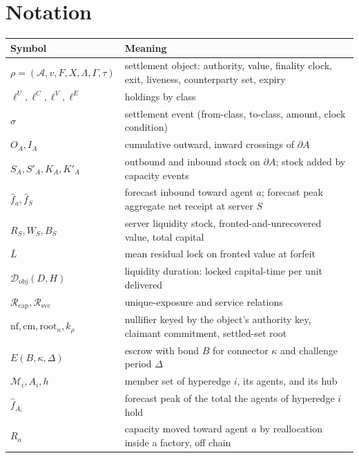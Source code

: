\documentclass[11pt]{article}
\theoremstyle{plain}
\theoremstyle{definition}
\theoremstyle{remark}
\newcommand{\Dur}{\mathcal{D}}
\newcommand{\Rcap}{\mathcal{R}_{\mathrm{cap}}}
\newcommand{\Rsvc}{\mathcal{R}_{\mathrm{svc}}}
\newcommand{\auth}{\mathcal{A}}
\begin{document}



\appendix

\section{Notation}
\label{app:notation}

\begin{center}
\small
\begin{tabular}{@{}>{\raggedright\arraybackslash}p{4.6cm}>{\raggedright\arraybackslash}p{9.6cm}@{}}
\toprule
Symbol & Meaning \\
\midrule
$\rho=(\auth,v,F,X,\Lambda,\Gamma,\tau)$ & settlement object: authority, value, finality clock, exit, liveness, counterparty set, expiry \\
$\ell^U,\ell^C,\ell^V,\ell^E$ & holdings by class \\
$\sigma$ & settlement event (from-class, to-class, amount, clock condition) \\
$O_A,I_A$ & cumulative outward, inward crossings of $\partial A$ \\
$S_A,S'_A,K_A,K'_A$ & outbound and inbound stock on $\partial A$; stock added by capacity events \\
$\hat f_a,\hat f_S$ & forecast inbound toward agent $a$; forecast peak aggregate net receipt at server $S$ \\
$R_S,W_S,B_S$ & server liquidity stock, fronted-and-unrecovered value, total capital \\
$\bar L$ & mean residual lock on fronted value at forfeit \\
$\Dur_{\mathrm{obj}}(D,H)$ & liquidity duration: locked capital-time per unit delivered \\
$\Rcap,\Rsvc$ & unique-exposure and service relations \\
$\mathrm{nf},\mathrm{cm},\mathrm{root}_n,k_\rho$ & nullifier keyed by the object's authority key, claimant commitment, settled-set root \\
$E(B,\kappa,\Delta)$ & escrow with bond $B$ for connector $\kappa$ and challenge period $\Delta$ \\
$\mathcal M_i,A_i,h$ & member set of hyperedge $i$, its agents, and its hub \\
$\hat f_{A_i}$ & forecast peak of the total the agents of hyperedge $i$ hold \\
$R_a$ & capacity moved toward agent $a$ by reallocation inside a factory, off chain \\

\end{tabular}
\end{center}
\end{document}
